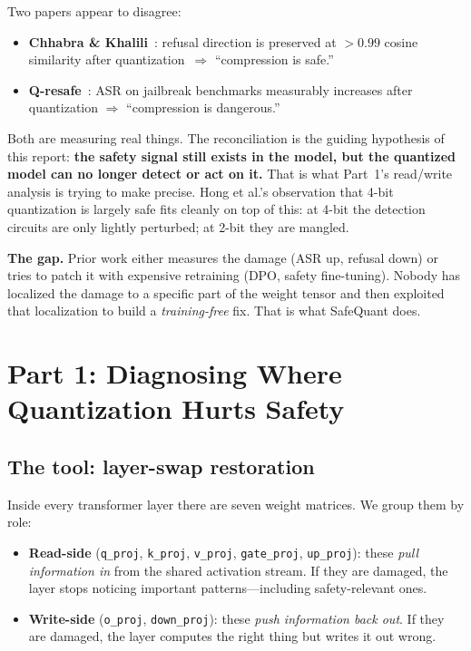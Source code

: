 \documentclass[11pt]{article}
\begin{document}
\begin{keyinsight}
Two papers appear to disagree:
\begin{itemize}
    \item \textbf{Chhabra \& Khalili}~\cite{chhabra2025aird}: refusal direction is preserved at $>0.99$ cosine similarity after quantization~$\Rightarrow$ ``compression is safe.''
    \item \textbf{Q-resafe}~\cite{qresafe2025}: ASR on jailbreak benchmarks measurably increases after quantization $\Rightarrow$ ``compression is dangerous.''
\end{itemize}
Both are measuring real things. The reconciliation is the guiding hypothesis of this report: \textbf{the safety signal still exists in the model, but the quantized model can no longer detect or act on it.} That is what Part~1's read/write analysis is trying to make precise. Hong et al.'s observation that 4-bit quantization is largely safe fits cleanly on top of this: at 4-bit the detection circuits are only lightly perturbed; at 2-bit they are mangled.
\end{keyinsight}

\textbf{The gap.} Prior work either measures the damage (ASR up, refusal down) or tries to patch it with expensive retraining (DPO, safety fine-tuning). Nobody has localized the damage to a specific part of the weight tensor and then exploited that localization to build a \emph{training-free} fix. That is what SafeQuant does.

\section{Part 1: Diagnosing Where Quantization Hurts Safety}
\label{sec:part1}

\subsection{The tool: layer-swap restoration}

Inside every transformer layer there are seven weight matrices. We group them by role:
\begin{itemize}
    \item \textbf{Read-side} (\texttt{q\_proj}, \texttt{k\_proj}, \texttt{v\_proj}, \texttt{gate\_proj}, \texttt{up\_proj}): these \emph{pull information in} from the shared activation stream. If they are damaged, the layer stops noticing important patterns---including safety-relevant ones.
    \item \textbf{Write-side} (\texttt{o\_proj}, \texttt{down\_proj}): these \emph{push information back out}. If they are damaged, the layer computes the right thing but writes it out wrong.
\end{itemize}
\end{document}

